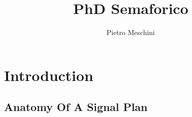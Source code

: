 \documentclass{mzkThesis}
\author{Pietro Meschini}
\title{PhD Semaforico}
\begin{document}
\frontmatter



\mainmatter
\chapter{Introduction}
\section{Anatomy Of A Signal Plan}



\appendix

\backmatter

\printindex
\end{document}

